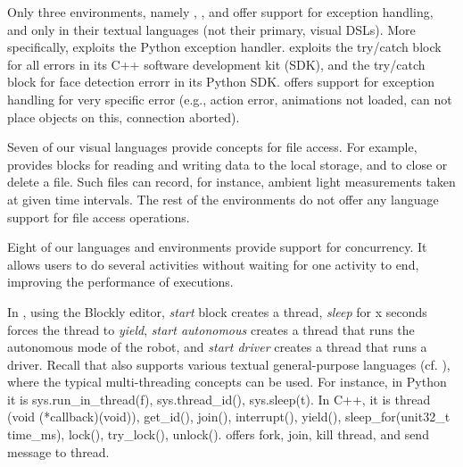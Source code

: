 
 Only three environments, namely \openroberta, \choregraphe, and \codelab offer support for exception handling, and only in their textual languages (not their primary, visual DSLs). %
More specifically, \openroberta exploits the Python exception handler. \choregraphe exploits the try/catch block for all errors in its C++ software development kit (SDK), and the try/catch block for face detection errorr in its Python SDK. \codelab offers support for exception handling for very specific error (e.g., action error, animations not loaded, can not place objects on this, connection aborted). %

 Seven of our visual languages provide concepts for file access. For example, \lego provides blocks for reading and writing data to the local storage, and to close or delete a file. Such files can record, for instance, ambient light measurements taken at given time intervals.
The rest of the environments do not offer any language support for file access operations.

\parhead{\fmultithread} Eight of our languages and environments provide support for concurrency. It allows users to do several activities without waiting for one activity to end, improving the performance of executions.

In \robotmesh, using the Blockly editor,  \textit{start} block creates a thread, \textit{sleep} for x seconds forces the thread to \textit{yield}, \textit{start autonomous} creates a thread that runs the autonomous mode of the robot, and \textit{start driver} creates a thread that runs a driver. Recall that \robotmesh also supports various textual general-purpose languages (cf. ), where the typical multi-threading concepts can be used. For instance, in Python it is sys.run\_in\_thread(f), sys.thread\_id(), sys.sleep(t). In C++, it is thread (void (*callback)(void)), get\_id(), join(), interrupt(), yield(), sleep\_for(unit32\_t time\_ms), lock(), try\_lock(), unlock(). \trik offers fork, join, kill thread, and send message to thread.

